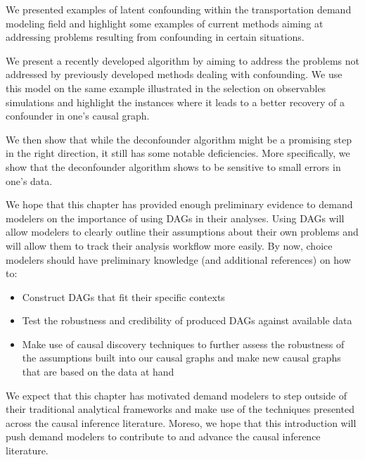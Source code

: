 We presented examples of latent confounding within the transportation demand modeling field and highlight 
some examples of current methods aiming at addressing problems resulting from confounding in certain situations.

We present a recently developed algorithm by \citet{wang_2019_blessings} aiming to address the problems not 
addressed by previously developed methods dealing with confounding. We use this model on the same example illustrated in
the selection on observables simulations and highlight the instances where it leads to a better recovery of 
a confounder in one's causal graph. 

We then show that while the deconfounder algorithm might be a promising step in the right direction, 
it still has some notable deficiencies. More specifically, we show that the deconfounder algorithm shows 
to be sensitive to small errors in one's data.

We hope that this chapter has provided enough preliminary evidence to demand modelers on the importance of using DAGs in their analyses.
Using DAGs will allow modelers to clearly outline their assumptions about their own problems and will allow them to track their analysis workflow more easily.
By now, choice modelers should have preliminary knowledge (and additional references) on how to:
\begin{itemize}
    \item Construct DAGs that fit their specific contexts
    \item Test the robustness and credibility of produced DAGs against available data
    \item Make use of causal discovery techniques to further assess the robustness of the assumptions built into our causal graphs and make new causal graphs that are based on the data at hand
\end{itemize}

We expect that this chapter has motivated demand modelers to step outside of their traditional analytical frameworks and make use of the techniques presented across the causal inference literature.
Moreso, we hope that this introduction will push demand modelers to contribute to and advance the causal inference literature.